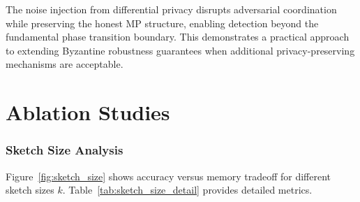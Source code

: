 \documentclass[runningheads]{llncs}
\begin{document}
The noise injection from differential privacy disrupts adversarial coordination while preserving the honest MP structure, enabling detection beyond the fundamental phase transition boundary. This demonstrates a practical approach to extending Byzantine robustness guarantees when additional privacy-preserving mechanisms are acceptable.

\section{Ablation Studies}

\subsubsection{Sketch Size Analysis}

Figure~\ref{fig:sketch_size} shows accuracy versus memory tradeoff for different sketch sizes $k$. Table~\ref{tab:sketch_size_detail} provides detailed metrics.
\end{document}

